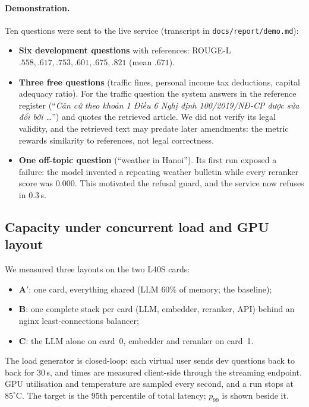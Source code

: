 \documentclass[11pt,a4paper]{article}
\newcommand{\rl}{ROUGE-L}
\begin{document}
\paragraph{Demonstration.}
Ten questions were sent to the live service (transcript in \texttt{docs/report/demo.md}):
\begin{itemize}[leftmargin=*]
\item \textbf{Six development questions} with references: \rl{} $.558,.617,.753,.601,.675,.821$ (mean $.671$).
\item \textbf{Three free questions} (traffic fines, personal income tax deductions, capital adequacy ratio). For the traffic question the system answers in the reference register (``\textit{Căn cứ theo khoản 1 Điều 6 Nghị định 100/2019/NĐ-CP được sửa đổi bởi \ldots}'') and quotes the retrieved article. We did not verify its legal validity, and the retrieved text may predate later amendments: the metric rewards similarity to references, not legal correctness.
\item \textbf{One off-topic question} (``weather in Hanoi''). Its first run exposed a failure: the model invented a repeating weather bulletin while every reranker score was $0.000$. This motivated the refusal guard, and the service now refuses in $0.3$\,s.
\end{itemize}

\subsection{Capacity under concurrent load and GPU layout}\label{sec:capacity}
We measured three layouts on the two L40S cards:
\begin{itemize}[leftmargin=*]
\item \textbf{A$'$}: one card, everything shared (LLM $60\%$ of memory; the baseline);
\item \textbf{B}: one complete stack per card (LLM, embedder, reranker, API) behind an nginx least-connections balancer;
\item \textbf{C}: the LLM alone on card~0, embedder and reranker on card~1.
\end{itemize}
The load generator is closed-loop: each virtual user sends dev questions back to back for $30$\,s, and times are measured client-side through the streaming endpoint. GPU utilisation and temperature are sampled every second, and a run stops at $85^\circ$C. The target is the $95$th percentile of total latency; $p_{99}$ is shown beside it.
\end{document}
